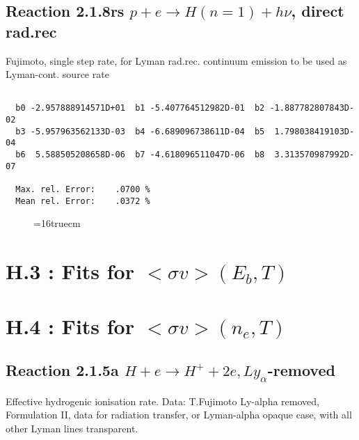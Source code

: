 \documentclass[12pt]{article}
\begin{document}
\subsection{
Reaction 2.1.8rs
 $ p + e \rightarrow H(n=1) + h\nu$, direct rad.rec 
}
Fujimoto, single step rate, for Lyman rad.rec. continuum emission
to be used as Lyman-cont. source rate

\begin{small}\begin{verbatim}

  b0 -2.957888914571D+01  b1 -5.407764512982D-01  b2 -1.887782807843D-02
  b3 -5.957963562133D-03  b4 -6.689096738611D-04  b5  1.798038419103D-04
  b6  5.588505208658D-06  b7 -4.618096511047D-06  b8  3.313570987992D-07

  Max. rel. Error:    .0700 %
  Mean rel. Error:    .0372 %

\end{verbatim}\end{small}
\begin{figure} \label{2.1.8rs}
\epsfxsize=16truecm
\end{figure}
\newpage
\section{H.3 :  Fits for $<\sigma v> (E_b,T)$}
\newpage

\section{H.4 :  Fits for $<\sigma v> (n_e,T)$}

\subsection{
Reaction 2.1.5a  $H + e \rightarrow H^+ + 2e, Ly_\alpha$-removed }

   Effective hydrogenic ionisation rate. Data: T.Fujimoto
   Ly-alpha removed, Formulation II, data for radiation transfer,
   or Lyman-alpha opaque case, with all other Lyman lines transparent.
\end{document}
